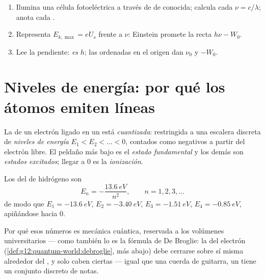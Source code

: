 \begin{method}\label{met:g12:quantum-world:measure-h}
\begin{enumerate}
  \item Ilumina una célula fotoeléctrica a través de  de 
        conocida; calcula cada $\nu = c/\lambda$; anota cada .
  \item Representa $E_{k,\max} = eU_s$ frente a $\nu$: Einstein promete la recta
        $h\nu - W_0$.
  \item Lee la pendiente: \emph{es} $h$; las ordenadas en el origen dan $\nu_0$ y
        $-W_0$.
\end{enumerate}
\end{method}

\section{Niveles de energía: por qué los átomos emiten líneas}

\begin{definition}\label{def:g12:quantum-world:levels}
La  de un electrón ligado en un  está
\emph{cuantizada}: restringida a una escalera discreta de
\emph{niveles de energía} $E_1 < E_2 < \dots < 0$, contados
como negativos a partir del electrón libre. El peldaño más bajo es el \emph{estado
fundamental} y los demás son \emph{estados
excitados}; llegar a $0$ es la
\emph{ionización}.
\end{definition}

\begin{proposition}\label{prop:g12:quantum-world:hydrogen}
Los  del  de hidrógeno son
\[
E_n = -\frac{\qty{13.6}{eV}}{n^2}, \qquad n = 1, 2, 3, \dots
\]
de modo que $E_1 = \qty{-13.6}{eV}$, $E_2 = \qty{-3.40}{eV}$,
$E_3 = \qty{-1.51}{eV}$, $E_4 = \qty{-0.85}{eV}$, apiñándose hacia $0$.
\end{proposition}
\admitted

\begin{remark}\label{rem:g12:quantum-world:ladder-origin}
Por qué esos números es mecánica cuántica, reservada a los volúmenes universitarios
--- como también lo es la fórmula de De Broglie: la  del electrón
(\cref{def:g12:quantum-world:debroglie}, más abajo) debe cerrarse sobre sí misma
alrededor del , y solo caben ciertas  --- igual que una cuerda
de guitarra, un  tiene un conjunto discreto de notas.
\end{remark}


